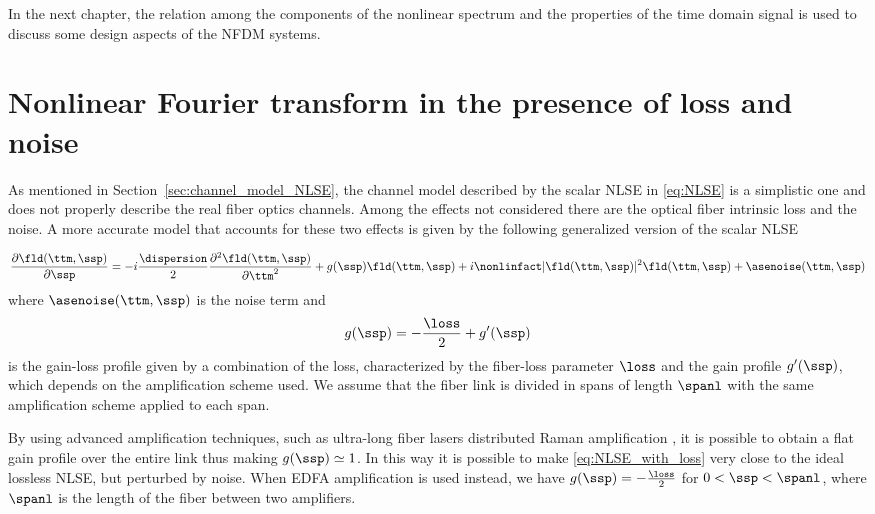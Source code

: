 In the next chapter, the relation among the components of the nonlinear spectrum and the properties of the time domain signal is used to discuss some design aspects of the \ac{NFDM} systems.


\section{Nonlinear Fourier transform in the presence of loss and noise}\label{sec:NFT_loss_and_noise}
As mentioned in Section~\ref{sec:channel_model_NLSE}, the channel model described by the scalar \ac{NLSE} in \eqref{eq:NLSE} is a simplistic
one and does not properly describe the real fiber optics channels. Among the effects not considered there are the optical fiber intrinsic loss and the noise.
A more accurate model that accounts for these two effects is given by the following generalized version of the scalar \ac{NLSE}

\begin{equation}\label{eq:NLSE_with_loss}
\frac{\partial \fld(\ttm,\ssp)}{\partial \ssp} =
-i \frac{\dispersion}{2} \frac{\partial^2 \fld(\ttm,\ssp)}{\partial \ttm^2}
+ g(\ssp)\fld(\ttm,\ssp)
+ i\nonlinfact |\fld(\ttm,\ssp)|^2 \fld(\ttm,\ssp)
+ \asenoise(\ttm,\ssp)
\end{equation}
where $\asenoise(\ttm,\ssp)$ is the noise term and
\begin{equation}
 g(\ssp) = - \dfrac{\loss}{2} + g'(\ssp)
\end{equation}
is the gain-loss profile given by a combination of the loss, characterized by
the fiber-loss parameter $\loss$ and the gain profile
$g'(\ssp)$, which depends on the amplification scheme used. We assume that the
fiber link is divided in spans of length $\spanl$ with the same amplification
scheme applied to each span.

By using advanced amplification techniques, such as ultra-long fiber lasers distributed Raman amplification \cite{ania2006ultralong}, it is possible
to obtain a flat gain profile over the entire link thus making $g(\ssp)
\simeq 1 $. In this way it is possible to make \eqref{eq:NLSE_with_loss} very close
to the ideal lossless NLSE, but perturbed by noise.
When \ac{EDFA} amplification is used instead, we have $g(\ssp) = - \frac{\loss}{2} $
for $0 < \ssp < \spanl$, where $\spanl$ is the length of the fiber between two
amplifiers.

